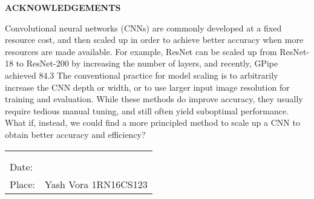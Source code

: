 \thispagestyle{empty}
\begin{center}
\textup{\large{\textbf{ACKNOWLEDGEMENTS}}} \\[0.1in]
\end{center}

\justify
\indent
Convolutional neural networks (CNNs) are commonly developed at a fixed resource cost, and then scaled up in order to achieve better accuracy when more resources are made available. For example, ResNet can be scaled up from ResNet-18 to ResNet-200 by increasing the number of layers, and recently, GPipe achieved 84.3%
\medskip
The conventional practice for model scaling is to arbitrarily increase the CNN depth or width, or to use larger input image resolution for training and evaluation. While these methods do improve accuracy, they usually require tedious manual tuning, and still often yield suboptimal performance. 
\medskip
What if, instead, we could find a more principled method to scale up a CNN to obtain better accuracy and efficiency?


\vfill

\justify
\begin{tabularx}{\linewidth}{X X}
 & {\hfill}\textup{ }\\ 
  & {\hfill}\textup{ }\\ 
 \textup{Date:} & {\hfill}\textup{ }\\
\textup{Place:} & {\hfill}\textup{Yash Vora 1RN16CS123}\\
\end{tabularx}


\pagebreak